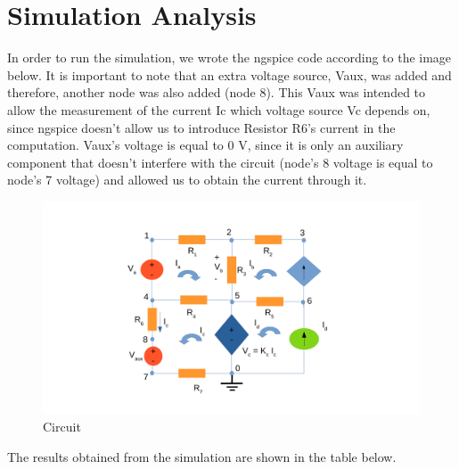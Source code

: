 \section{Simulation Analysis}
\label{sec:simulation}


	In order to run the simulation, we wrote the ngspice code according to the image below. It is important to note that an extra voltage source, Vaux, was added and therefore, another node was also added (node 8). This Vaux was intended to allow the measurement of the current Ic which voltage source Vc depends on, since ngspice doesn't allow us to introduce Resistor R6's current in the computation. Vaux's voltage is equal to 0 V, since it is only an auxiliary component that doesn't interfere with the circuit (node's 8 voltage is equal to node's 7 voltage) and allowed us to obtain the current through it.

\begin{figure}[H]
\centering
\includegraphics[width = 15cm]{system1.pdf}
\caption {Circuit}
\end{figure}


The results obtained from the simulation are shown in the table below. 

